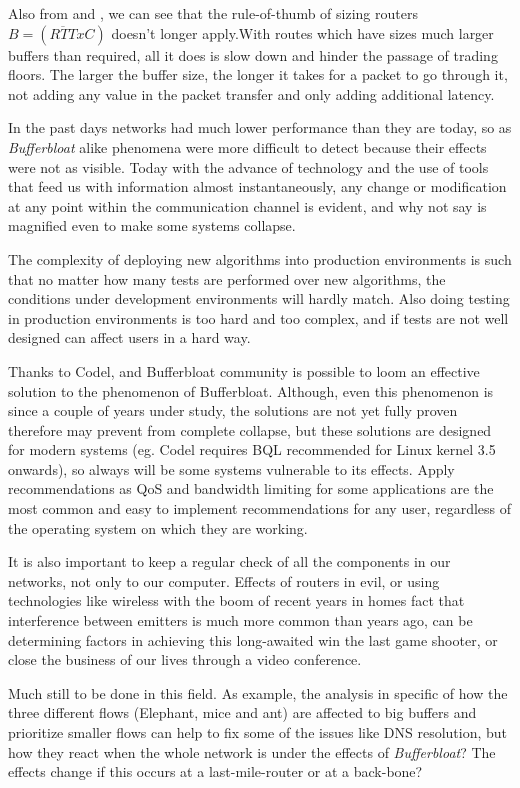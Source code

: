 Also from \cite{main:ref:1} and \cite{Vu-Brugier}, we can see that the rule-of-thumb of sizing routers $B = (\overline{RTT}xC)$ doesn't longer apply.With
routes which have sizes much larger buffers than required, all it does is slow
down and hinder the passage of trading floors. The larger the buffer size, the
longer it takes for a packet to go through it, not adding any value in the
packet transfer and only adding additional latency.

In the past days networks had much lower performance than they are today,
so as \emph{Bufferbloat} alike phenomena were more difficult to detect
because their effects were not as visible. Today with the advance of
technology and the use of tools that feed us with information almost
instantaneously, any change or modification at any point within the
communication channel is evident, and why not say is magnified even to make
some systems collapse.

The complexity of deploying new algorithms into production environments is
such that no matter how many tests are performed over new algorithms, the
conditions under development environments will hardly match. Also doing testing
in production environments is too hard and too complex\cite{Vu-Brugier},
and if tests are not well designed can affect users in a hard way.

Thanks to Codel, and Bufferbloat community is possible to loom an effective
solution to the phenomenon of Bufferbloat. Although, even this phenomenon is
since a couple of years under study, the solutions are not yet fully proven
therefore may prevent from complete collapse, but these solutions are designed
for modern systems (eg. Codel requires BQL recommended for Linux kernel 3.5
onwards), so always will be some systems vulnerable to its effects. Apply
recommendations as QoS and bandwidth limiting for some applications are the
most common and easy to implement recommendations for any user, regardless of
the operating system on which they are working.

It is also important to keep a regular check of all the components in our
networks, not only to our computer. Effects of routers in evil, or using
technologies like wireless with the boom of recent years in homes fact that
interference between emitters is much more common than years ago, can be
determining factors in achieving this long-awaited win the last game shooter,
or close the business of our lives through a video conference.

Much still to be done in this field. As example, the analysis in specific of
how the three different flows (Elephant, mice and
ant)\cite{HaElephants}\cite{evolvshortlongflows} are affected to big buffers
and prioritize smaller flows can help to fix some of the issues like DNS
resolution, but how they react when the whole network is under the effects of
\emph{Bufferbloat}? The effects change if this occurs at a last-mile-router
or at a back-bone?

